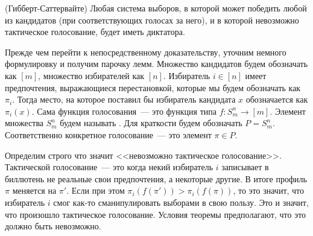 \begin{thm}
(Гибберт-Саттервайте) Любая система выборов, в которой может победить любой из кандидатов (при соответствующих голосах за него), и в которой невозможно тактическое голосование, будет иметь диктатора.
\end{thm}

Прежде чем перейти к непосредственному доказательству, уточним немного формулировку и получим парочку лемм. Множество кандидатов будем обозначать как $[m]$, множество избирателей как $[n]$. Избиратель $i\in [n]$ имеет предпочтения, выражающиеся перестановкой, которые мы будем обозначать как $\pi_i$. Тогда место, на которое поставил бы избиратель кандидата $x$ обозначается как $\pi_i(x)$. Сама функция голосования~--- это функция типа $f:S_m^n\to [m]$. Элемент множества $S_m^n$ будем называть . Для краткости будем обозначать $P = S_m^n$. Соответственно конкретное голосование~--- это элемент $\pi\in P$.

Определим строго что значит <<невозможно тактическое голосование>>. Тактической голосование~--- это когда некий избиратель $i$ записывает в биллютень не реальные свои предпочтения, а некоторые другие. В итоге профиль $\pi$ меняется на $\pi'$. Если при этом $\pi_i(f(\pi')) > \pi_i(f(\pi))$, то это значит, что избиратель $i$ смог как-то сманипулировать выборами в свою пользу. Это и значит, что произошло тактическое голосование. Условия теоремы предполагают, что это должно быть невозможно.

\begin{lemma}

\end{lemma}